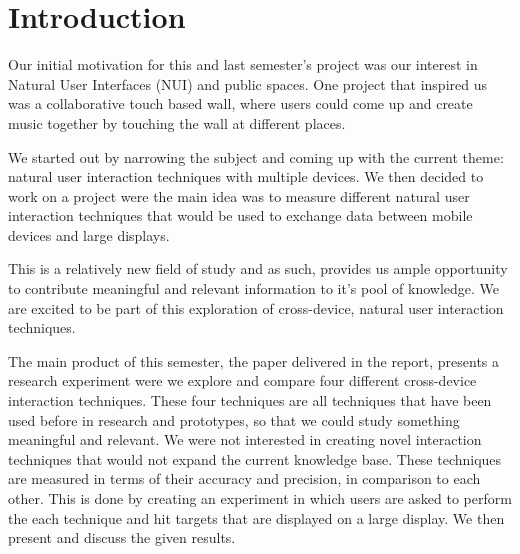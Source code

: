 \section*{Introduction}\label{sec:introduction}

Our initial motivation for this and last semester's project was our interest in Natural User Interfaces (NUI) and public spaces.
One project that inspired us was a collaborative touch based wall, where users could come up and create music together by touching the wall at different places.

We started out by narrowing the subject and coming up with the current theme: natural user interaction techniques with multiple devices. 
We then decided to work on a project were the main idea was to measure different natural user interaction techniques that would be used to exchange data between mobile devices and large displays. 

This is a relatively new field of study and as such, provides us ample opportunity to contribute meaningful and relevant information to it's pool of knowledge. 
We are excited to be part of this exploration of cross-device, natural user interaction techniques. 

The main product of this semester, the paper delivered in the report, presents a research experiment were we explore and compare four different cross-device interaction techniques. 
These four techniques are all techniques that have been used before in research and prototypes, so that we could study something meaningful and relevant.
We were not interested in creating novel interaction techniques that would not expand the current knowledge base.
These techniques are measured in terms of their accuracy and precision, in comparison to each other.
This is done by creating an experiment in which users are asked to perform the each technique and hit targets that are displayed on a large display.
We then present and discuss the given results. 